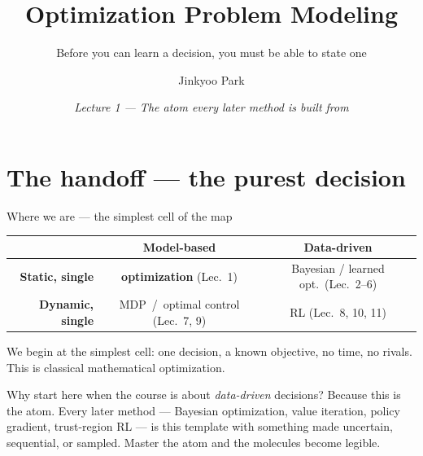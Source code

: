 \documentclass[10pt, aspectratio=169]{beamer}
\title{Optimization Problem Modeling}
\subtitle{Before you can learn a decision, you must be able to state one}
\author{Jinkyoo Park}
\institute{KAIST}
\date{\textit{Lecture 1 --- The atom every later method is built from}}
\begin{document}
\maketitle

\section{The handoff --- the purest decision}

\begin{frame}{Where we are --- the simplest cell of the map}
\vspace{2pt}
\begin{center}\footnotesize\renewcommand{\arraystretch}{1.5}
\begin{tabular}{r|c|c}
 & \textbf{Model-based} & \textbf{Data-driven} \\
\hline
\textbf{Static, single}  & \cellcolor{mDarkTeal!20}\textbf{optimization} \scriptsize(\alert{Lec.\ 1}) & Bayesian / learned opt.\ \scriptsize(Lec.\ 2--6)\\
\hline
\textbf{Dynamic, single} & MDP \,/\, optimal control \scriptsize(Lec.\ 7, 9) & RL \scriptsize(Lec.\ 8, 10, 11)\\
\end{tabular}
\end{center}
\smallskip

We begin at the \alert{simplest cell}: one decision, a known objective, no time, no rivals. This is classical mathematical optimization.
\smallskip

\pause
Why start here when the course is about \emph{data-driven} decisions? Because this is the \alert{atom}. Every later method --- Bayesian optimization, value iteration, policy gradient, trust-region RL --- is this template with something made uncertain, sequential, or sampled. Master the atom and the molecules become legible.
\end{frame}
\end{document}
